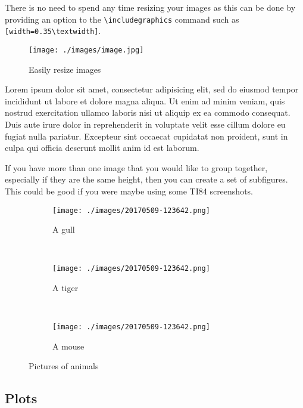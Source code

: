 \documentclass[a4paper,12pt]{article}
\begin{document}
There is no need to spend any time resizing your images as this can be done by providing an option to the \verb!\includegraphics! command such as \verb![width=0.35\textwidth]!.  
\begin{figure}[h]
  \centering
  \texttt{[image: ./images/image.jpg]}
  \caption{Easily resize images}
\end{figure}

Lorem ipsum dolor sit amet, consectetur adipisicing elit, sed do eiusmod tempor incididunt ut labore et dolore magna aliqua. Ut enim ad minim veniam, quis nostrud exercitation ullamco laboris nisi ut aliquip ex ea commodo consequat. Duis aute irure dolor in reprehenderit in voluptate velit esse cillum dolore eu fugiat nulla pariatur. Excepteur sint occaecat cupidatat non proident, sunt in culpa qui officia deserunt mollit anim id est laborum.\cite{mathworld:completethesquare}

If you have more than one image that you would like to group together, especially if they are the same height, then you can create a set of subfigures.  This could be good if you were maybe using some TI84 screenshots.

\begin{figure}
    \centering
    \begin{subfigure}[b]{0.3\textwidth}
        \texttt{[image: ./images/20170509-123642.png]}
        \caption{A gull}
        \label{fig:gull}
    \end{subfigure}
    ~ %
    \begin{subfigure}[b]{0.3\textwidth}
        \texttt{[image: ./images/20170509-123642.png]}
        \caption{A tiger}
        \label{fig:tiger}
    \end{subfigure}
    ~ %
    \begin{subfigure}[b]{0.3\textwidth}
        \texttt{[image: ./images/20170509-123642.png]}
        \caption{A mouse}
        \label{fig:mouse}
    \end{subfigure}
    \caption{Pictures of animals}\label{fig:animals}
\end{figure}

\subsection*{Plots}\label{subsec:plots}
\end{document}
